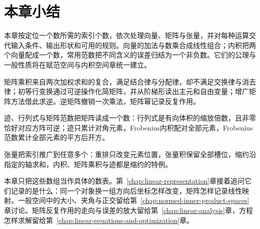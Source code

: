 
\section{本章小结}
\label{sec:ls-operations-summary}

本章按定位一个数所需的索引个数，依次处理向量、矩阵与张量，并对每种运算交代输入条件、输出形状和可用的规则。向量的加法与数乘合成线性组合；内积把两个向量配成一个数，常用范数把不同含义的误差归结为一个非负数。它们的公理与一般性质将在赋范空间与内积空间章统一建立。

矩阵乘积来自两次加权求和的复合，满足结合律与分配律，却不满足交换律与消去律；初等行变换通过可逆操作化简矩阵，并从阶梯形读出主元和自由变量；增广矩阵方法借此求逆。逆矩阵撤销一次乘法，矩阵幂记录反复作用。

迹、行列式与矩阵范数把矩阵读成一个数：行列式是有向体积的缩放倍数，且非零恰好对应方阵可逆；迹只累计对角元素，Frobenius内积配对全部元素，Frobenius范数累计全部元素的平方后开方。

张量把索引推广到任意多个：重排只改变元素位置，张量积保留全部槽位，缩约沿指定的轴求和，内积、矩阵乘积与迹都是缩约的特例。

本章只把这些数组当作具体的数表。第~\ref{chap:linear-representation}章接着追问它们记录的是什么：同一个对象换一组方向后坐标怎样改变，矩阵怎样记录线性映射。一般空间中的大小、夹角与正交留给第~\ref{chap:normed-inner-product-spaces}章讨论。矩阵反复作用的走向与误差的放大留给第~\ref{chap:linear-analysis}章，方程怎样求解留给第~\ref{chap:linear-equations-and-optimization}章。
